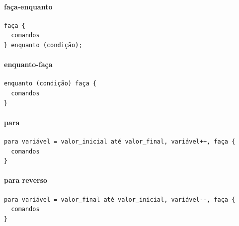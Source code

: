 \documentclass[12pt,a4paper]{article}
\begin{document}
    \hypertarget{fauxe7a-enquanto}{%
\paragraph{faça-enquanto}\label{fauxe7a-enquanto}}

\begin{verbatim}
faça {
  comandos
} enquanto (condição);
\end{verbatim}

    \hypertarget{enquanto-fauxe7a}{%
\paragraph{enquanto-faça}\label{enquanto-fauxe7a}}

\begin{verbatim}
enquanto (condição) faça {
  comandos
}
\end{verbatim}

    \hypertarget{para}{%
\paragraph{para}\label{para}}

\begin{verbatim}
para variável = valor_inicial até valor_final, variável++, faça {
  comandos
}
\end{verbatim}

    \hypertarget{para-reverso}{%
\paragraph{para reverso}\label{para-reverso}}

\begin{verbatim}
para variável = valor_final até valor_inicial, variável--, faça {
  comandos
}
\end{verbatim}
\end{document}
